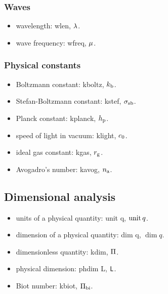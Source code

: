 \subsubsection{Waves}
\begin{itemize}
\item wavelength: wlen, $\lambda$.
\item wave frequency: wfreq, $\mu$.
\end{itemize}


\subsubsection{Physical constants}
\begin{itemize}
\item Boltzmann constant: kboltz, $k_\text{b}$.
\item Stefan-Boltzmann constant: kstef, $\sigma_\text{sb}$.
\item Planck constant: kplanck, $h_\text{p}$.
\item speed of light in vacuum: klight, $c_0$.
\item ideal gas constant: kgas, $r_\text{g}$.
\item Avogadro's number: kavog, $n_\text{a}$.
\end{itemize}


\subsection{Dimensional analysis}
\begin{itemize}
\item units of a physical quantity: unit q, $\operatorname{unit} q$.
\item dimension of a physical quantity: dim q, $\dim q$.
\item dimensionless quantity: kdim, $\Pi$.
\item physical dimension: phdim L, $\mathsf{L}$.
\item Biot number: kbiot, $\Pi_\text{bi}$.
\end{itemize}

